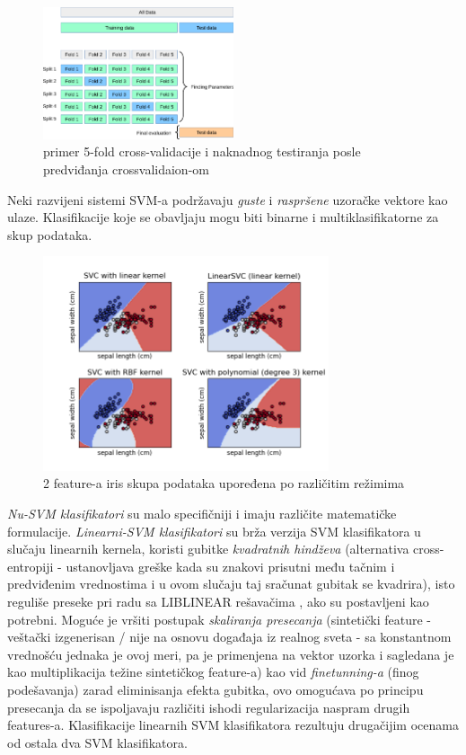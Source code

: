\documentclass[fontsize=12bp, paper=a4]{scrarticle}
\begin{document}
\begin{figure}[h!]
    \centering
    \includegraphics[width=0.5\textwidth]{image-20.png}
    \caption{\centering primer 5-fold cross-validacije i naknadnog testiranja posle predviđanja crossvalidaion-om}
\end{figure}

Neki razvijeni sistemi SVM-a podržavaju \textit{guste} i \textit{raspršene} uzoračke vektore kao ulaze. 
Klasifikacije koje se obavljaju mogu biti binarne i multiklasifikatorne za skup podataka.

\begin{figure}[h!]
    \centering
    \includegraphics[width=0.75\textwidth]{image-13.png}
    \caption{2 feature-a iris skupa podataka upoređena po različitim režimima}
\end{figure}

\textit{Nu-SVM klasifikatori} su malo specifičniji i imaju različite matematičke formulacije. \textit{Linearni-SVM klasifikatori} su brža verzija SVM klasifikatora u slučaju linearnih kernela, koristi gubitke \textit{kvadratnih hindževa} (alternativa cross-entropiji - ustanovljava greške kada su znakovi prisutni među tačnim i predviđenim vrednostima i u ovom slučaju taj sračunat gubitak se kvadrira)\cite{hinge}, isto reguliše preseke pri radu sa LIBLINEAR rešavačima
, ako su postavljeni kao potrebni. Moguće je vršiti postupak \textit{skaliranja presecanja} (sintetički feature - veštački izgenerisan / nije na osnovu događaja iz realnog sveta - sa konstantnom vrednošću jednaka je ovoj meri, pa je primenjena na vektor uzorka i sagledana je kao multiplikacija težine sintetičkog feature-a)\cite{intercept-scaling}\cite{syntetic-feature} kao vid \textit{finetunning-a} (finog podešavanja) zarad eliminisanja efekta gubitka, ovo omogućava po principu presecanja da se ispoljavaju različiti ishodi regularizacija naspram drugih features-a. Klasifikacije linearnih SVM klasifikatora rezultuju drugačijim ocenama od ostala dva SVM klasifikatora.
\end{document}
